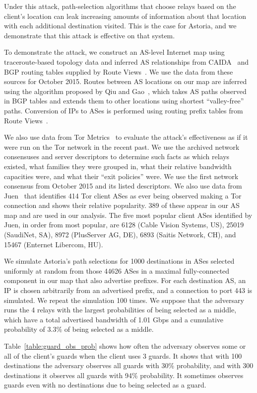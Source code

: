 \documentclass[conference]{styles/IEEEtran}
\begin{document}
Under this attack, path-selection algorithms that choose relays based on the client's location can
leak increasing amounts of information about that location with each additional destination visited.
This is the case for Astoria, and we demonstrate that this attack is effective on that system.

To demonstrate the attack, we construct an AS-level Internet map using traceroute-based topology
data and inferred AS relationships from CAIDA~\cite{caida} and BGP routing tables supplied by
Route Views~\cite{routeviews}. We use the data from these sources for October 2015. Routes between
AS locations on our map are inferred using the algorithm proposed by Qiu and Gao~\cite{Qiu05aspath},
which takes AS paths observed in BGP tables and extends them to other locations using shortest
``valley-free'' paths. Conversion of IPs to ASes is performed using routing prefix tables from
Route Views~\cite{routeviews-prefix2as}.

We also use data from Tor Metrics~\cite{tormetrics} to evaluate the attack's effectiveness as if it
were run on the Tor network in the recent past. We use the archived network consensuses and server
descriptors to determine such facts as which relays existed, what families they were grouped in,
what their relative bandwidth capacities were, and what their ``exit policies'' were. We use the
first network consensus from October 2015 and its listed descriptors.
We also use data from Juen~\cite{juen-masters} that identifies 414 Tor client ASes as ever being
observed making a Tor connection and shows their relative popularity. 389 of these appear in our
AS map and are used in our analysis.
The five most popular client ASes identified by Juen, in order from most popular, are 6128 (Cable
Vision Systems, US), 25019 (SaudiNet, SA), 8972 (PlusServer AG, DE), 6893 (Saitis Network, CH), and
15467 (Enternet Libercom, HU).

We simulate Astoria's path selections for 1000 destinations in ASes selected uniformly at random
from those 44626 ASes in a maximal fully-connected component in our map that also advertise
prefixes. For each destination AS, an IP is chosen arbitrarily from an advertised prefix, and a
connection to port 443 is simulated. We repeat the simulation 100 times. We suppose that the
adversary runs the 4 relays with
the largest probabilities of being selected as a middle, which have a total advertised bandwidth of
1.01 Gbps and a cumulative probability of 3.3\% of being selected as a middle.

Table~\ref{table:guard_obs_prob} shows how often the adversary observes some or all of the client's
guards when the client uses 3 guards. It shows that with 100 destinations the adversary observes all
guards with 30\% probability, and with 300 destinations it observes all guards with 94\%
probability. It sometimes observes guards even with no destinations due to being selected as
a guard.
\end{document}
